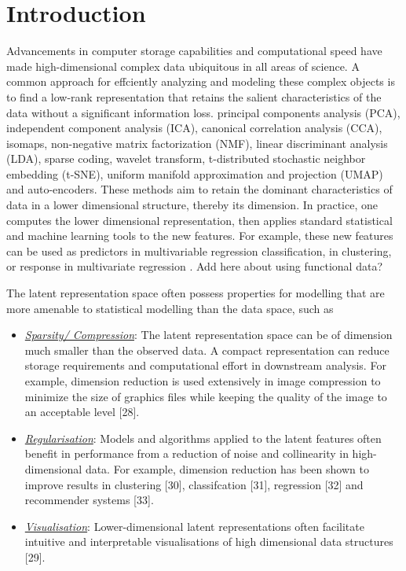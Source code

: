 \section{Introduction}

Advancements in computer storage capabilities and computational speed have made high-dimensional complex data ubiquitous in all areas of science. A common approach for effciently analyzing and modeling these complex objects is to find a low-rank representation that retains the salient characteristics of the data without a significant information loss.
 principal components analysis (PCA), independent component analysis (ICA), canonical correlation analysis (CCA), isomaps, non-negative matrix factorization (NMF), linear discriminant analysis (LDA), sparse coding, wavelet transform, t-distributed stochastic neighbor embedding (t-SNE), uniform manifold approximation and projection (UMAP) and auto-encoders. 
These methods aim to retain the dominant characteristics of data in a lower dimensional structure, thereby its dimension. 
In practice, one computes the lower dimensional representation, then applies standard statistical and machine learning tools to the new features. 
For example, these new features can be used as predictors in multivariable regression  classification, in clustering, or  response  in multivariate regression .
{\color{purple}Add here about using functional data?}

The latent representation space often possess properties for modelling that are more amenable to statistical modelling than the data space, such as
\begin{itemize}
    \item \emph{\underline{Sparsity/ Compression}}: The latent representation space can be of dimension much smaller than the observed data. A compact representation can reduce storage requirements and computational effort in downstream analysis. For example, dimension reduction is used extensively in image compression to minimize the size of graphics files while keeping the quality of the image to an acceptable level [28].
    \item \emph{\underline{Regularisation}}: Models and algorithms applied to the latent features often benefit in performance from a reduction of noise and collinearity in high-dimensional data. For example, dimension reduction has been shown to improve results in clustering [30], classifcation [31], regression [32] and recommender systems [33].
    \item \emph{\underline{Visualisation}}: Lower-dimensional latent representations often facilitate intuitive and interpretable visualisations of high dimensional data structures [29]. 
\end{itemize}

